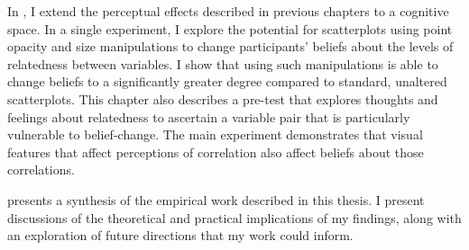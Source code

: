 \documentclass[../main.tex]{subfiles}
\begin{document}
In , I extend the perceptual effects described
in previous chapters to a cognitive space. In a single experiment, I
explore the potential for scatterplots using point opacity and size
manipulations to change participants' beliefs about the levels of
relatedness between variables. I show that using such manipulations is
able to change beliefs to a significantly greater degree compared to
standard, unaltered scatterplots. This chapter also describes a pre-test
that explores thoughts and feelings about relatedness to ascertain a
variable pair that is particularly vulnerable to belief-change. The main
experiment demonstrates that visual features that affect perceptions of
correlation also affect beliefs about those correlations.

 presents a synthesis of the empirical work
described in this thesis. I present discussions of the theoretical and
practical implications of my findings, along with an exploration of
future directions that my work could inform.
\end{document}
